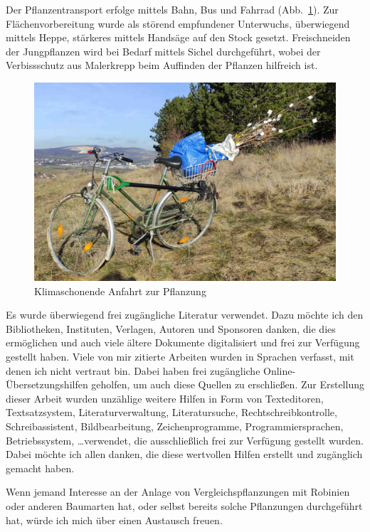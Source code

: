 \documentclass[twocolumn]{scrartcl}
\begin{document}
Der Pflanzentransport
erfolge mittels Bahn, Bus und Fahrrad
(Abb.~\ref{fig:fahrradPflanzung}). Zur Flächenvorbereitung wurde als
störend empfundener Unterwuchs, überwiegend mittels Heppe, stärkeres
mittels Handsäge auf den Stock gesetzt. Freischneiden der Jungpflanzen
wird bei Bedarf mittels Sichel durchgeführt, wobei der Verbissschutz
aus Malerkrepp beim Auffinden der Pflanzen hilfreich ist.

\begin{figure}[htbp]
  \centering
  \includegraphics[width=.9\linewidth]{./bild/fahrradPflanzung}
  \caption{Klimaschonende Anfahrt zur Pflanzung}
  \label{fig:fahrradPflanzung}
\end{figure}

Es wurde überwiegend frei zugängliche Literatur verwendet. Dazu möchte ich den
Bibliotheken, Instituten, Verlagen, Autoren und Sponsoren danken, die dies
ermöglichen und auch viele ältere Dokumente digitalisiert und frei zur Verfügung
gestellt haben. Viele von mir zitierte Arbeiten wurden in Sprachen verfasst, mit
denen ich nicht vertraut bin. Dabei haben frei zugängliche
Online-Übersetzungshilfen geholfen, um auch diese Quellen zu erschließen. Zur
Erstellung dieser Arbeit wurden unzählige weitere Hilfen in Form von
Texteditoren, Textsatzsystem, Literaturverwaltung, Literatursuche,
Rechtschreibkontrolle, Schreibassistent, Bildbearbeitung, Zeichenprogramme,
Programmiersprachen, Betriebssystem, \dots verwendet, die ausschließlich frei
zur Verfügung gestellt wurden. Dabei möchte ich allen danken, die diese
wertvollen Hilfen erstellt und zugänglich gemacht haben.

Wenn jemand Interesse an der Anlage von Vergleichspflanzungen mit Robinien oder anderen Baumarten hat, oder selbst bereits solche Pflanzungen durchgeführt hat, würde ich mich über einen Austausch freuen.


%
\printbibliography

\end{document}
